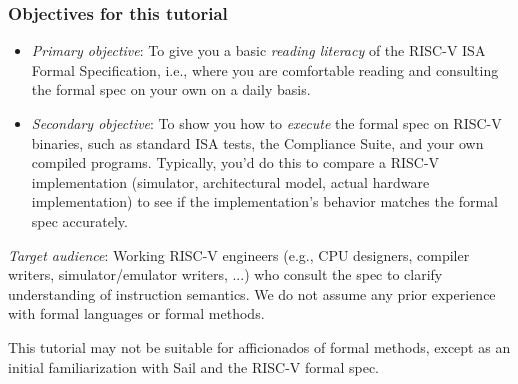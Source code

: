 \documentclass[aspectratio=169]{beamer}
\newcommand{\slidefont}{\scriptsize}
\begin{document}

\begin{frame}
  \frametitle{Objectives for this tutorial}

  \slidefont

  \begin{itemize}
    \item \emph{Primary objective}: To give you a basic \emph{reading
      literacy} of the RISC-V ISA Formal Specification, i.e., where
      you are comfortable reading and consulting the formal spec on
      your own on a daily basis.

    \item \emph{Secondary objective}: To show you how to \emph{execute} the
      formal spec on RISC-V binaries, such as standard ISA tests, the
      Compliance Suite, and your own compiled programs.  Typically,
      you'd do this to compare a RISC-V implementation (simulator,
      architectural model, actual hardware implementation) to see if
      the implementation's behavior matches the formal spec
      accurately.

 \end{itemize}

 \emph{Target audience}: Working RISC-V engineers (e.g., CPU
 designers, compiler writers, simulator/emulator writers, ...) who
 consult the spec to clarify understanding of instruction semantics.
 We do not assume any prior experience with formal languages or formal
 methods.

 \vspace{1ex}

 This tutorial may not be suitable for afficionados of formal methods,
 except as an initial familiarization with Sail and the RISC-V formal
 spec.

\end{frame}

\end{document}
